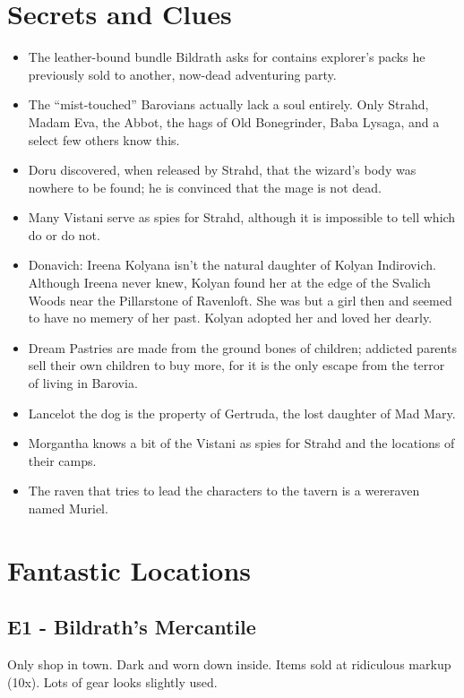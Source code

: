 \documentclass[a4paper,11pt]{article}
\begin{document}
\section{Secrets and Clues}
\label{sec:SecretsAndClues}
\begin{itemize}
  \item The leather-bound bundle Bildrath asks for contains explorer's packs he previously sold to another,
  now-dead adventuring party.
  \item The ``mist-touched'' Barovians actually lack a soul entirely. Only Strahd, Madam Eva, the Abbot, the hags
  of Old Bonegrinder, Baba Lysaga, and a select few others know this.
  \item Doru discovered, when released by Strahd, that the wizard's body was nowhere to be found; he is 
  convinced that the mage is not dead.
  \item Many Vistani serve as spies for Strahd, although it is impossible to tell which do or do not.
  \item Donavich: Ireena Kolyana isn't the natural daughter of Kolyan Indirovich. Although Ireena never knew, 
  Kolyan found her at the edge of the Svalich Woods near the Pillarstone of Ravenloft. She was but a girl then 
  and seemed to have no memery of her past. Kolyan adopted her and loved her dearly.
  \item Dream Pastries are made from the ground bones of children; addicted parents sell their own children to 
  buy more, for it is the only escape from the terror of living in Barovia.
  \item Lancelot the dog is the property of Gertruda, the lost daughter of Mad Mary.
  \item Morgantha knows a bit of the Vistani as spies for Strahd and the locations of their camps.
  \item The raven that tries to lead the characters to the tavern is a wereraven named Muriel.
\end{itemize}

\section{Fantastic Locations}
\label{sec:FantasticLocations}
\subsection{E1 - Bildrath's Mercantile}
  Only shop in town. Dark and worn down inside. Items sold at ridiculous markup (10x). Lots of gear looks 
  slightly used.
\end{document}
